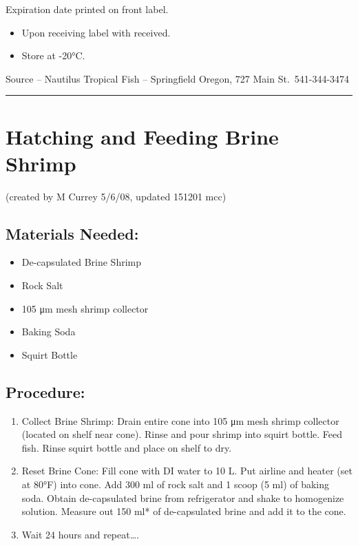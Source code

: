 \documentclass[
]{book}
\providecommand{\tightlist}{%
  \setlength{\itemsep}{0pt}\setlength{\parskip}{0pt}}
\begin{document}
Expiration date printed on front label.

\begin{itemize}
\tightlist
\item
  Upon receiving label with received.
\item
  Store at -20°C.
\end{itemize}

Source -- Nautilus Tropical Fish -- Springfield Oregon, 727 Main St.~541-344-3474

\begin{center}\rule{0.5\linewidth}{0.5pt}\end{center}

\hypertarget{hatching-and-feeding-brine-shrimp}{%
\section{Hatching and Feeding Brine Shrimp}\label{hatching-and-feeding-brine-shrimp}}

(created by M Currey 5/6/08, updated 151201 mcc)

\hypertarget{materials-needed-2}{%
\subsection{Materials Needed:}\label{materials-needed-2}}

\begin{itemize}
\tightlist
\item
  De-capsulated Brine Shrimp
\item
  Rock Salt
\item
  105 μm mesh shrimp collector
\item
  Baking Soda
\item
  Squirt Bottle
\end{itemize}

\hypertarget{procedure-4}{%
\subsection{Procedure:}\label{procedure-4}}

\begin{enumerate}
\def\labelenumi{\arabic{enumi}.}
\tightlist
\item
  Collect Brine Shrimp: Drain entire cone into 105 μm mesh shrimp collector (located on shelf near cone). Rinse and pour shrimp into squirt bottle. Feed fish. Rinse squirt bottle and place on shelf to dry.
\item
  Reset Brine Cone: Fill cone with DI water to 10 L. Put airline and heater (set at 80°F) into cone. Add 300 ml of rock salt and 1 scoop (5 ml) of baking soda. Obtain de-capsulated brine from refrigerator and shake to homogenize solution. Measure out 150 ml* of de-capsulated brine and add it to the cone.
\item
  Wait 24 hours and repeat\ldots.
\end{enumerate}
\end{document}

